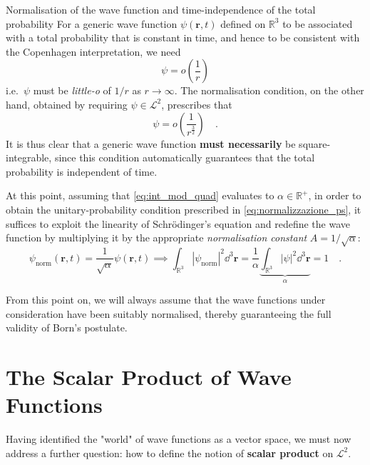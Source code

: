 \begin{concettochiave}{Normalisation of the wave function and time-independence of the total probability}
    \noindent
    For a generic wave function $\psi(\bm{r},t)$ defined on $\mathbb{R}^3$ to be associated with a total probability that is constant in time, and hence to be consistent with the Copenhagen interpretation, we need
    \[
        \psi = o\left(\frac{1}{r} \right)
    \] 
    i.e.\ $\psi$ must be \emph{little-o} of $1/r$ as $r \to \infty$.
    The normalisation condition, on the other hand, obtained by requiring $\psi \in \mathcal{L}^2$, prescribes that
    \[
        \psi = {o}\left(\frac{1}{r^{\frac{3}{2}}} \right) \quad.
    \]
    It is thus clear that a generic wave function \textbf{must necessarily} be square-integrable, since this condition automatically guarantees that the total probability is independent of time.
\end{concettochiave}

\noindent
At this point, assuming that \eqref{eq:int_mod_quad} evaluates to $\alpha \in \mathbb{R}^+$, in order to obtain the unitary-probability condition prescribed in \eqref{eq:normalizzazione_ps}, it suffices to exploit the linearity of Schrödinger's equation and redefine the wave function by multiplying it by the appropriate \emph{normalisation constant} $A = 1/\sqrt{\alpha}$:
\[
    \psi_{\text{norm}}(\bm{r}, t) = \frac{1}{\sqrt{\alpha}} \psi(\bm{r}, t) \implies \int_{\mathbb{R}^3} |\psi_{\text{norm}}|^2 \dd^3{\bm{r}} = \frac{1}{\alpha} \underbrace{\int_{\mathbb{R}^3} |\psi|^2 \dd^3{\bm{r}}}_{\alpha} = 1 \quad.
\]

From this point on, we will always assume that the wave functions under consideration have been suitably normalised, thereby guaranteeing the full validity of Born's postulate.

\section{The Scalar Product of Wave Functions}
\label{sec:prodotto_scalare}
Having identified the "world" of wave functions as a vector space, we must now address a further question: how to define the notion of \textbf{scalar product} on $\mathcal{L}^2$.

